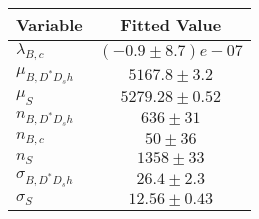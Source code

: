 \begin{tabular}[t]{lc}
\hline
Variable &Fitted Value\\
\hline\hline
$\lambda_{B,c}$&$(-0.9\pm8.7)e-07$\\
\hline
$\mu_{B, D^* D_s h}$&$5167.8\pm3.2$\\
\hline
$\mu_S$&$5279.28\pm0.52$\\
\hline
$n_{B, D^* D_s h}$&$636\pm31$\\
\hline
$n_{B,c}$&$50\pm36$\\
\hline
$n_S$&$1358\pm33$\\
\hline
$\sigma_{B, D^* D_s h}$&$26.4\pm2.3$\\
\hline
$\sigma_S$&$12.56\pm0.43$\\
\hline
\end{tabular}